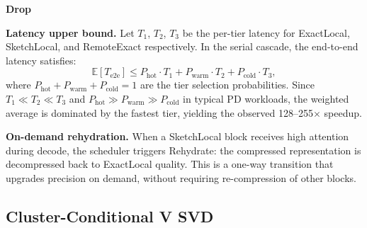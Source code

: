 \documentclass[11pt, a4paper, oneside]{article}
\theoremstyle{myplain}
\theoremstyle{mydefinition}
\theoremstyle{myremark}
\begin{document}
\begin{algorithm}[t]
    \caption{serial\_cascade: Cascade KV block through tiers}




    \Return \textbf{Drop}
    \label{algo:serial_cascade}
\end{algorithm}

\textbf{Latency upper bound.} Let $T_1$, $T_2$, $T_3$ be the per-tier latency for ExactLocal, SketchLocal, and RemoteExact respectively. In the serial cascade, the end-to-end latency satisfies:
\begin{equation}
    \mathbb{E}[T_{\text{e2e}}] \leq P_{\text{hot}} \cdot T_1 + P_{\text{warm}} \cdot T_2 + P_{\text{cold}} \cdot T_3,
    \label{eq:latency_bound}
\end{equation}
where $P_{\text{hot}} + P_{\text{warm}} + P_{\text{cold}} = 1$ are the tier selection probabilities. Since $T_1 \ll T_2 \ll T_3$ and $P_{\text{hot}} \gg P_{\text{warm}} \gg P_{\text{cold}}$ in typical PD workloads, the weighted average is dominated by the fastest tier, yielding the observed 128--255$\times$ speedup.

\textbf{On-demand rehydration.} When a SketchLocal block receives high attention during decode, the scheduler triggers Rehydrate: the compressed representation is decompressed back to ExactLocal quality. This is a one-way transition that upgrades precision on demand, without requiring re-compression of other blocks.

\subsection{Cluster-Conditional V SVD}
\label{sec:cluster_svd}
\end{document}
